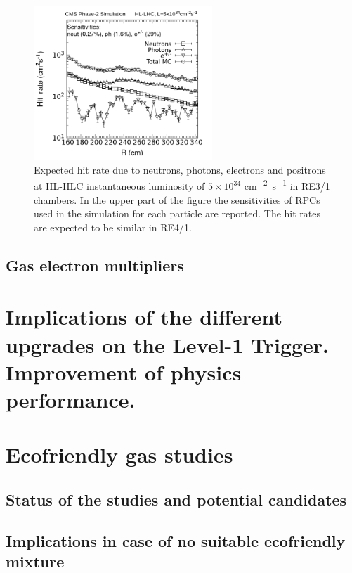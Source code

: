 	\begin{figure}[H]
		\centering
		\includegraphics[width=0.6\textwidth]{fig/chapt3/RPC-Sim-HL-LHC_Rate.png}
		\caption{\label{fig:iRPC-Rate} Expected hit rate due to neutrons, photons, electrons and positrons at HL-HLC instantaneous luminosity of $5\times10^{34}$ \si{cm^{-2}s^{-1}} in RE3/1 chambers. In the upper part of the figure the sensitivities of RPCs used in the simulation for each particle are reported. The hit rates are expected to be similar in RE4/1.}
	\end{figure}
	
	\subsection{Gas electron multipliers}
	\label{chapt3:ssec:GEMs}

\section{Implications of the different upgrades on the Level-1 Trigger. Improvement of physics performance.}
\label{chapt3:sec:L1tP2}

\section{Ecofriendly gas studies}
\label{chapt3:sec:EcoGas}

	\subsection{Status of the studies and potential candidates}
	\label{chapt3:ssec:GasStatus}

	\subsection{Implications in case of no suitable ecofriendly mixture}
	\label{chapt3:ssec:GasConsequences}

\clearpage{\pagestyle{empty}\cleardoublepage}